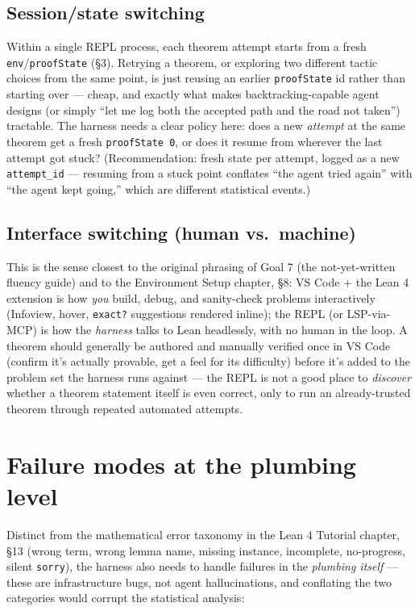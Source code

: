 \subsection{Session/state switching}

Within a single REPL process, each theorem attempt starts from a fresh \texttt{env}/\texttt{proofState} (\S3). Retrying a theorem, or exploring two different tactic choices from the same point, is just reusing an earlier \texttt{proofState} id rather than starting over --- cheap, and exactly what makes backtracking-capable agent designs (or simply ``let me log both the accepted path and the road not taken'') tractable. The harness needs a clear policy here: does a new \emph{attempt} at the same theorem get a fresh \texttt{proofState 0}, or does it resume from wherever the last attempt got stuck? (Recommendation: fresh state per attempt, logged as a new \texttt{attempt\_id} --- resuming from a stuck point conflates ``the agent tried again'' with ``the agent kept going,'' which are different statistical events.)

\subsection{Interface switching (human vs.\ machine)}

This is the sense closest to the original phrasing of Goal 7 (the not-yet-written fluency guide) and to the Environment Setup chapter, \S8: VS Code + the Lean 4 extension is how \emph{you} build, debug, and sanity-check problems interactively (Infoview, hover, \texttt{exact?} suggestions rendered inline); the REPL (or LSP-via-MCP) is how the \emph{harness} talks to Lean headlessly, with no human in the loop. A theorem should generally be authored and manually verified once in VS Code (confirm it's actually provable, get a feel for its difficulty) before it's added to the problem set the harness runs against --- the REPL is not a good place to \emph{discover} whether a theorem statement itself is even correct, only to run an already-trusted theorem through repeated automated attempts.

\section{Failure modes at the plumbing level}

Distinct from the mathematical error taxonomy in the Lean 4 Tutorial chapter, \S13 (wrong term, wrong lemma name, missing instance, incomplete, no-progress, silent \texttt{sorry}), the harness also needs to handle failures in the \emph{plumbing itself} --- these are infrastructure bugs, not agent hallucinations, and conflating the two categories would corrupt the statistical analysis:

